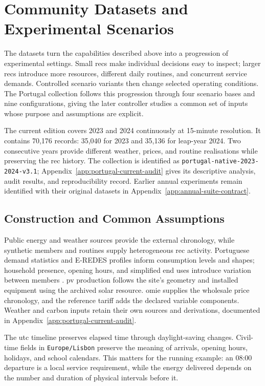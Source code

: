\section{Community Datasets and Experimental Scenarios}
\label{sec:sim-annual-dataset-suite}

The datasets turn the capabilities described above into a progression of experimental settings. Small \glspl{rec} make individual decisions easy to inspect; larger \glspl{rec} introduce more resources, different daily routines, and concurrent service demands. Controlled scenario variants then change selected operating conditions. The Portugal collection follows this progression through four scenario bases and nine configurations, giving the later controller studies a common set of inputs whose purpose and assumptions are explicit.

The current edition covers 2023 and 2024 continuously at 15-minute resolution. It contains 70,176 records: 35,040 for 2023 and 35,136 for leap-year 2024. Two consecutive years provide different weather, prices, and routine realisations while preserving the \gls{rec} history. The collection is identified as \texttt{portugal-native-2023-2024-v3.1}; Appendix~\ref{app:portugal-current-audit} gives its descriptive analysis, audit results, and reproducibility record. Earlier annual experiments remain identified with their original datasets in Appendix~\ref{app:annual-suite-contract}.

\subsection{Construction and Common Assumptions}
\label{sec:sim-dataset-common-contract}

Public energy and weather sources provide the external chronology, while synthetic members and routines supply heterogeneous \gls{rec} activity. Portuguese demand statistics and E-REDES profiles inform consumption levels and shapes; household presence, opening hours, and simplified end uses introduce variation between members \parencite{dgegconsumption2023,pordataconsumption2023}. \gls{pv} production follows the site's geometry and installed equipment using the archived solar resource. \gls{omie} supplies the wholesale price chronology, and the reference tariff adds the declared variable components. Weather and carbon inputs retain their own sources and derivations, documented in Appendix~\ref{app:portugal-current-audit}.

The \gls{utc} timeline preserves elapsed time through daylight-saving changes. Civil-time fields in \texttt{Europe/Lisbon} preserve the meaning of arrivals, opening hours, holidays, and school calendars. This matters for the running example: an 08:00 departure is a local service requirement, while the energy delivered depends on the number and duration of physical intervals before it.

